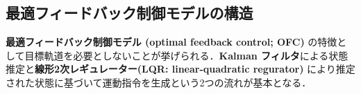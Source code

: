 \subsection{最適フィードバック制御モデルの構造}\textbf{最適フィードバック制御モデル (optimal feedback control; OFC)} の特徴として目標軌道を必要としないことが挙げられる．\textbf{Kalman フィルタ}による状態推定と\textbf{線形2次レギュレーター(LQR: linear-quadratic regurator)} により推定された状態に基づいて運動指令を生成という2つの流れが基本となる．